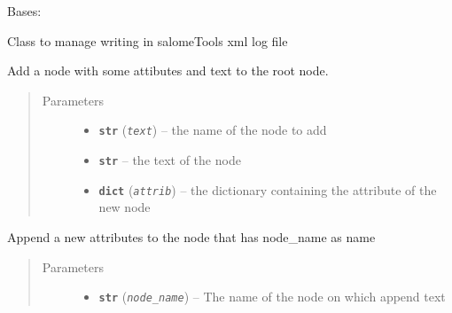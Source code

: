 \documentclass[a4paper,10pt,english]{sphinxmanual}
\begin{document}
\begin{fulllineitems}
\label{commands/apidoc/src:src.xmlManager.XmlLogFile}
Bases: 

Class to manage writing in salomeTools xml log file

\begin{fulllineitems}
\label{commands/apidoc/src:src.xmlManager.XmlLogFile.add_simple_node}
Add a node with some attibutes and text to the root node.
\begin{quote}\begin{description}
\item[{Parameters}] \leavevmode\begin{itemize}
\item {} 
\textbf{\texttt{str}} (\emph{\texttt{text}}) -- the name of the node to add

\item {} 
\textbf{\texttt{str}} -- the text of the node

\item {} 
\textbf{\texttt{dict}} (\emph{\texttt{attrib}}) -- the dictionary containing the 
attribute of the new node

\end{itemize}

\end{description}\end{quote}

\end{fulllineitems}


\begin{fulllineitems}
\label{commands/apidoc/src:src.xmlManager.XmlLogFile.append_node_attrib}
Append a new attributes to the node that has node\_name as name
\begin{quote}\begin{description}
\item[{Parameters}] \leavevmode\begin{itemize}
\item {} 
\textbf{\texttt{str}} (\emph{\texttt{node\_name}}) -- The name of the node on which append text


\end{itemize}
\end{description}
\end{quote}
\end{fulllineitems}
\end{fulllineitems}
\end{document}

